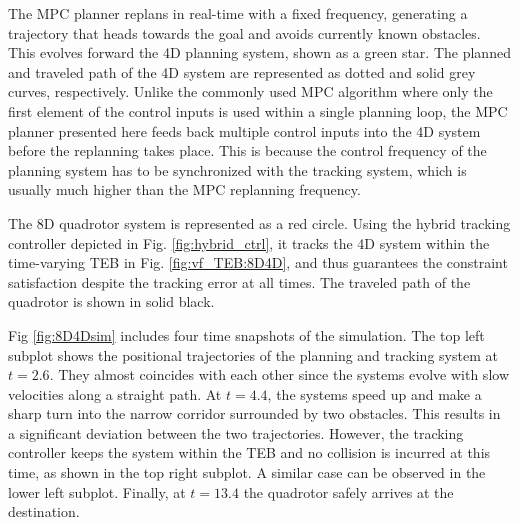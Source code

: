 The MPC planner replans in real-time with a fixed frequency, generating a trajectory that heads towards the goal and avoids currently known obstacles. This evolves forward the 4D planning system, shown as a green star. The planned and traveled path of the 4D system are represented as dotted and solid grey curves, respectively. Unlike the commonly used MPC algorithm where only the first element of the control inputs is used within a single planning loop, the MPC planner presented here feeds back multiple control inputs into the 4D system before the replanning takes place. This is because the control frequency of the planning system has to be synchronized with the tracking system, which is usually much higher than the MPC replanning frequency.

The 8D quadrotor system is represented as a red circle. Using the hybrid tracking controller depicted in Fig. \ref{fig:hybrid_ctrl}, it tracks the 4D system within the time-varying TEB in Fig. \ref{fig:vf_TEB:8D4D}, and thus guarantees the constraint satisfaction despite the tracking error at all times. The traveled path of the quadrotor is shown in solid black.

Fig \ref{fig:8D4Dsim} includes four time snapshots of the simulation. The top left subplot shows the positional trajectories of the planning and tracking system at $t=2.6$. They almost coincides with each other since the systems evolve with slow velocities along a straight path. At $t=4.4$, the systems speed up and make a sharp turn into the narrow corridor surrounded by two obstacles. This results in a significant deviation between the two trajectories. However, the tracking controller keeps the system within the TEB and no collision is incurred at this time, as shown in the top right subplot. A similar case can be observed in the lower left subplot. Finally, at $t=13.4$ the quadrotor safely arrives at the destination.


